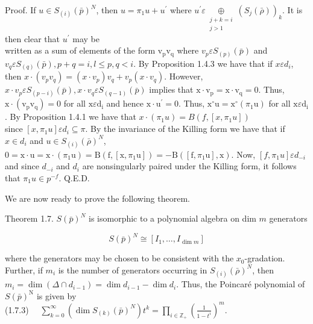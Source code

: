 \documentclass[10pt]{article}
\begin{document}
Proof. If $u \in S_{(i)}(\bar{p})^{N}$, then $u=\pi_{1} u+u^{\prime}$ where $u^{\prime} \varepsilon \underset{\substack{j+k=i \\ j>1}}{\oplus}\left(S_{j}(\bar{\rho})\right)_{k}$. It is then clear that $u^{\prime}$ may be\\
written as a sum of elements of the form $\mathrm{v}_{\mathrm{p}} \mathrm{v}_{\mathrm{q}}$ where $v_{p} \varepsilon S_{(p)}(\bar{p})$ and $v_{q} \varepsilon S_{(q)}(\bar{p}), p+q=i, l \leq p, q<i$. By Proposition 1.4.3 we have that if $x \varepsilon d_{i}$, then $x \cdot\left(v_{p} v_{q}\right)=\left(x \cdot v_{p}\right) v_{q}+v_{p}\left(x \cdot v_{q}\right)$. However, $x \cdot v_{p} \varepsilon S_{(p-i)}(\bar{p}), x \cdot v_{q} \varepsilon S_{(q-1)}(\bar{p})$ implies that $\mathrm{x} \cdot \mathrm{v}_{\mathrm{p}}=\mathrm{x} \cdot \mathrm{v}_{\mathrm{q}}=0$. Thus, $\mathrm{x} \cdot\left(\mathrm{v}_{\mathrm{p}} \mathrm{v}_{\mathrm{q}}\right)=0$ for all $\mathrm{x} \varepsilon \mathrm{d}_{\mathrm{i}}$ and hence $\mathrm{x} \cdot \mathrm{u}^{\prime}=0$. Thus, $\mathrm{x}^{\circ} \mathrm{u}=\mathrm{x}^{\circ}\left(\pi_{1} \mathrm{u}\right)$ for all $\mathrm{x} \varepsilon \mathrm{d}_{\mathrm{i}}$. By Proposition 1.4.1 we have that $x \cdot\left(\pi_{1} u\right)=B\left(f,\left[x, \pi_{1} u\right]\right)$\\
since $\left[x, \pi_{1} u\right] \varepsilon d_{i} \subseteq \pi$. By the invariance of the Killing form we have that if $x \in d_{i}$ and $u \in S_{(i)}(\bar{\rho})^{N}$, $0=\mathrm{x} \cdot \mathrm{u}=\mathrm{x} \cdot\left(\pi_{1} \mathrm{u}\right)=\mathrm{B}\left(\mathrm{f},\left[\mathrm{x}, \pi_{1} \mathrm{u}\right]\right)=-\mathrm{B}\left(\left[\mathrm{f}, \pi_{1} \mathrm{u}\right], \mathrm{x}\right)$. Now, $\left[f, \pi_{1} u\right] \varepsilon d_{-i}$ and since $d_{-i}$ and $d_{i}$ are nonsingularly paired under the Killing form, it follows that $\pi_{1} u \in p^{-f}$. Q.E.D.

We are now ready to prove the following theorem.

Theorem 1.7. $S(\bar{p})^{N}$ is isomorphic to a polynomial algebra on dim $m$ generators


\begin{equation*}
S(\bar{p})^{N} \cong\left[I_{1}, \ldots, I_{\operatorname{dim} m}\right] \tag{1.7.2}
\end{equation*}


where the generators may be chosen to be consistent with the $x_{0}$-gradation. Further, if $m_{i}$ is the number of generators occurring in $S_{(i)}(\bar{\rho})^{N}$, then $m_{i}=\operatorname{dim}\left(\Delta \cap d_{i-1}\right) =\operatorname{dim} d_{i-1}-\operatorname{dim} d_{i}$. Thus, the Poincaré polynomial of $S(\bar{p})^{\mathrm{N}}$ is given by\\
(1.7.3) $\quad \sum_{k=0}^{\infty}\left(\operatorname{dim} S_{(k)}(\bar{p})^{N}\right) t^{k}=\prod_{i \in \mathbb{Z}_{+}}\left(\frac{1}{1-t^{i}}\right)^{m}$.
\end{document}
